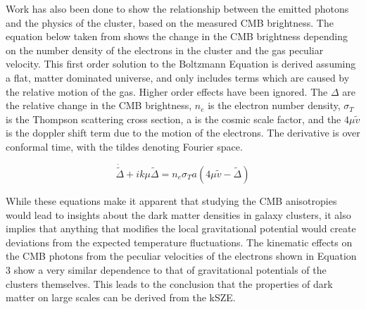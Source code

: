 \documentclass[manuscript]{aastex}
\begin{document}
Work has also been done to show the relationship between the emitted photons and the physics of the cluster, based on the measured CMB brightness. The equation below taken from \cite{Dodelson1995} shows the change in the CMB brightness depending on the number density of the electrons in the cluster and the gas peculiar velocity. This first order solution to the Boltzmann Equation is derived assuming a flat, matter dominated universe, and only includes terms which are caused by the relative motion of the gas. Higher order effects have been ignored. The $\Delta$ are the relative change in the CMB brightness, $n_{e}$ is the electron number density, $\sigma_{T}$ is the Thompson scattering cross section, a is the cosmic scale factor, and the $4 \mu \tilde v$ is the doppler shift term due to the motion of the electrons. The derivative is over conformal time, with the tildes denoting Fourier space. 

\begin{equation}
\dot{\tilde \Delta} + ik\mu \tilde\Delta = n_{e} \sigma_{T} a (4 \mu \tilde v - \tilde \Delta)
\end{equation}

While these equations make it apparent that studying the CMB anisotropies would lead to insights about the dark matter densities in galaxy clusters, it also implies that anything that modifies the local gravitational potential would create deviations from the expected temperature fluctuations. The kinematic effects on the CMB photons from the peculiar velocities of the electrons shown in Equation 3 show a very similar dependence to that of gravitational potentials of the clusters themselves. This leads to the conclusion that the properties of dark matter on large scales can be derived from the kSZE. 
\end{document}
